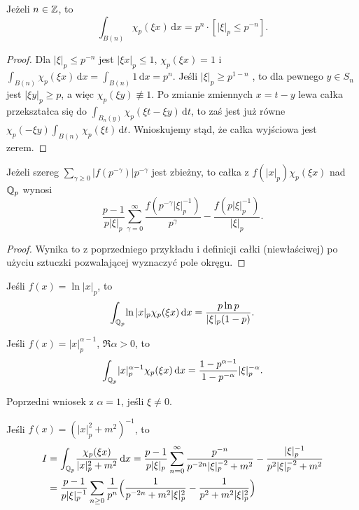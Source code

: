\begin{przyklad}
	Jeżeli $n \in \mathbb Z$, to
	\[
		\int_{B(n)}\! \chi_p(\xi x) \,\textrm{d}x = p^n \cdot [|\xi|_p \le p^{-n}].
	\]
\end{przyklad}

\begin{proof}
	Dla $|\xi|_p \le p^{-n}$ jest $|\xi x|_p \le 1$, $\chi_p(\xi x) = 1$ i $\int_{B(n)} \chi_p(\xi x)\,\textrm{d}x = \int_{B(n)} 1 \,\textrm{d}x = p^n$.
	Jeśli $|\xi|_p \ge p^{1-n}$	, to dla pewnego $y \in S_n$ jest $|\xi y|_p \ge p$, a więc $\chi_p(\xi y) \not \equiv 1$.
	Po zmianie zmiennych $x = t - y$ lewa całka przekształca się do
	$\int_{B_n(y)} \chi_p(\xi t - \xi y)\,\textrm{d} t$, to zaś jest już równe $\chi_p(- \xi y) \int_{B(n)} \chi_p(\xi t) \,\textrm{d} t$.
	Wnioskujemy stąd, że całka wyjściowa jest zerem.
\end{proof}

\begin{przyklad}
	Jeżeli szereg $\sum_{\gamma \ge 0} |f(p^{-\gamma})| p^{-\gamma}$ jest zbieżny, to całka z $f(|x|_p) \chi_p(\xi x)$ nad $\mathbb Q_p$ wynosi
	\[
		\frac{p-1}{p|\xi|_p} \sum_{\gamma=0}^\infty \frac{f(p^{-\gamma}|\xi|_p^{-1})}{p^\gamma} - \frac{f(p|\xi|_p^{-1})}{|\xi|_p}.
	\]
\end{przyklad}

\begin{proof}
	Wynika to z poprzedniego przykładu i definicji całki (niewłaściwej) po użyciu sztuczki pozwalającej wyznaczyć pole okręgu.
\end{proof}

\begin{wniosek}
	Jeśli $f (x) = \ln |x|_p$, to
	\[
		\int_{\mathbb Q_p} \! \ln |x|_p \chi_p(\xi x) \,\textrm{d}x = \frac{p \ln p}{|\xi|_p (1-p)}.
	\]
\end{wniosek}

\begin{wniosek}
	Jeśli $f (x) = |x|_p^{\alpha - 1}$, $\Re \alpha > 0$, to
	\[
		\int_{\mathbb Q_p} \! |x|_p^{\alpha - 1} \chi_p(\xi x) \,\textrm{d}x = \frac{1-p^{\alpha-1}}{1- p^{-\alpha}} |\xi|_p^{-\alpha}.
	\]
\end{wniosek}

\begin{wniosek}
	Poprzedni wniosek z $\alpha = 1$, jeśli $\xi \neq 0$.
\end{wniosek}

\begin{przyklad}
	Jeśli $f(x) = (|x|_p^2 + m^2)^{-1}$, to
	\begin{align*}
		I & = \int_{\mathbb Q_p} \!\frac{\chi_p(\xi x)}{|x|_p^2 + m^2} \,\textrm{d}x = \frac{p - 1}{p|\xi|_p} \sum_{n = 0}^\infty \frac{p^{-n}}{p^{-2n}|\xi|_p^{-2} + m^2} - \frac{|\xi|_p^{-1}}{p^2|\xi|_p^{-2} + m^2} \\
		& = \frac{p - 1}{p|\xi|_p^{-1}} \sum_{n \ge 0} \frac{1}{p^n} \Bigl(\frac{1}{p^{-2n}+m^2|\xi|_p^2}-\frac{1}{p^2+m^2|\xi|_p^2} \Bigr)
	\end{align*}
\end{przyklad}

